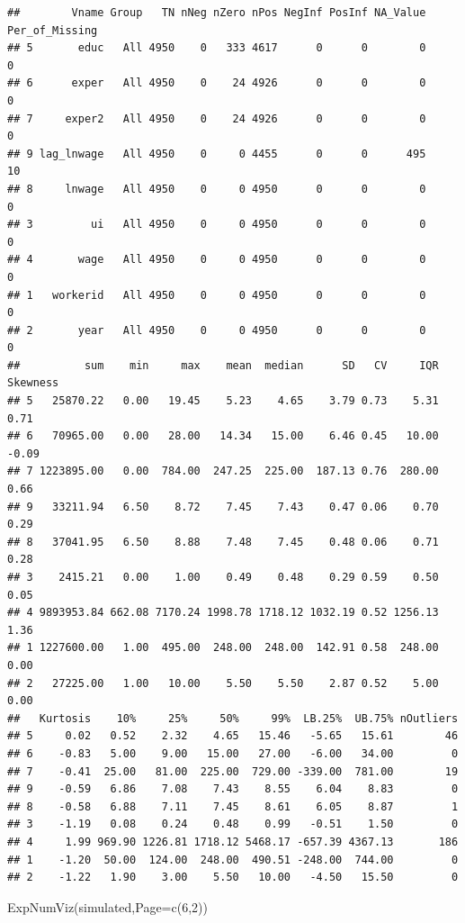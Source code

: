 \documentclass[
]{article}
\newenvironment{Shaded}{\begin{snugshade}}{\end{snugshade}}
\newcommand{\AttributeTok}[1]{\textcolor[rgb]{0.77,0.63,0.00}{#1}}
\newcommand{\DecValTok}[1]{\textcolor[rgb]{0.00,0.00,0.81}{#1}}
\newcommand{\FunctionTok}[1]{\textcolor[rgb]{0.00,0.00,0.00}{#1}}
\newcommand{\NormalTok}[1]{#1}
\begin{document}
\begin{verbatim}
##        Vname Group   TN nNeg nZero nPos NegInf PosInf NA_Value Per_of_Missing
## 5       educ   All 4950    0   333 4617      0      0        0              0
## 6      exper   All 4950    0    24 4926      0      0        0              0
## 7     exper2   All 4950    0    24 4926      0      0        0              0
## 9 lag_lnwage   All 4950    0     0 4455      0      0      495             10
## 8     lnwage   All 4950    0     0 4950      0      0        0              0
## 3         ui   All 4950    0     0 4950      0      0        0              0
## 4       wage   All 4950    0     0 4950      0      0        0              0
## 1   workerid   All 4950    0     0 4950      0      0        0              0
## 2       year   All 4950    0     0 4950      0      0        0              0
##          sum    min     max    mean  median      SD   CV     IQR Skewness
## 5   25870.22   0.00   19.45    5.23    4.65    3.79 0.73    5.31     0.71
## 6   70965.00   0.00   28.00   14.34   15.00    6.46 0.45   10.00    -0.09
## 7 1223895.00   0.00  784.00  247.25  225.00  187.13 0.76  280.00     0.66
## 9   33211.94   6.50    8.72    7.45    7.43    0.47 0.06    0.70     0.29
## 8   37041.95   6.50    8.88    7.48    7.45    0.48 0.06    0.71     0.28
## 3    2415.21   0.00    1.00    0.49    0.48    0.29 0.59    0.50     0.05
## 4 9893953.84 662.08 7170.24 1998.78 1718.12 1032.19 0.52 1256.13     1.36
## 1 1227600.00   1.00  495.00  248.00  248.00  142.91 0.58  248.00     0.00
## 2   27225.00   1.00   10.00    5.50    5.50    2.87 0.52    5.00     0.00
##   Kurtosis    10%     25%     50%     99%  LB.25%  UB.75% nOutliers
## 5     0.02   0.52    2.32    4.65   15.46   -5.65   15.61        46
## 6    -0.83   5.00    9.00   15.00   27.00   -6.00   34.00         0
## 7    -0.41  25.00   81.00  225.00  729.00 -339.00  781.00        19
## 9    -0.59   6.86    7.08    7.43    8.55    6.04    8.83         0
## 8    -0.58   6.88    7.11    7.45    8.61    6.05    8.87         1
## 3    -1.19   0.08    0.24    0.48    0.99   -0.51    1.50         0
## 4     1.99 969.90 1226.81 1718.12 5468.17 -657.39 4367.13       186
## 1    -1.20  50.00  124.00  248.00  490.51 -248.00  744.00         0
## 2    -1.22   1.90    3.00    5.50   10.00   -4.50   15.50         0
\end{verbatim}

\begin{Shaded}
\begin{Highlighting}[]
  \FunctionTok{ExpNumViz}\NormalTok{(simulated,}\AttributeTok{Page=}\FunctionTok{c}\NormalTok{(}\DecValTok{6}\NormalTok{,}\DecValTok{2}\NormalTok{))}
\end{Highlighting}
\end{Shaded}
\end{document}
